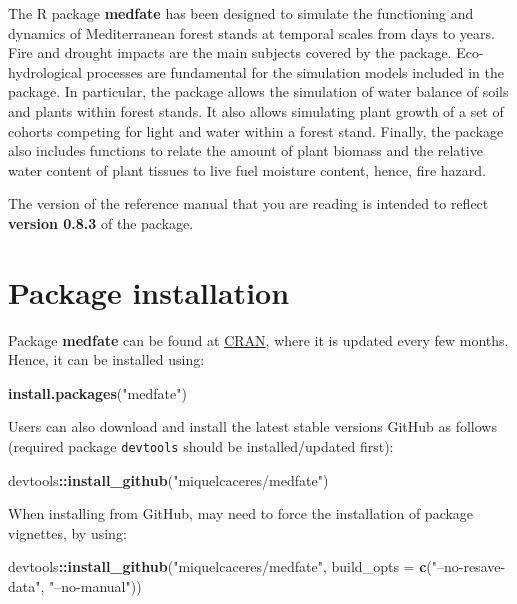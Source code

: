 \documentclass[]{book}
\newenvironment{Shaded}{\begin{snugshade}}{\end{snugshade}}
\newcommand{\KeywordTok}[1]{\textcolor[rgb]{0.13,0.29,0.53}{\textbf{#1}}}
\newcommand{\DataTypeTok}[1]{\textcolor[rgb]{0.13,0.29,0.53}{#1}}
\newcommand{\StringTok}[1]{\textcolor[rgb]{0.31,0.60,0.02}{#1}}
\newcommand{\OperatorTok}[1]{\textcolor[rgb]{0.81,0.36,0.00}{\textbf{#1}}}
\newcommand{\NormalTok}[1]{#1}
\begin{document}
The R package \textbf{medfate} has been designed to simulate the
functioning and dynamics of Mediterranean forest stands at temporal
scales from days to years. Fire and drought impacts are the main
subjects covered by the package. Eco-hydrological processes are
fundamental for the simulation models included in the package. In
particular, the package allows the simulation of water balance of soils
and plants within forest stands. It also allows simulating plant growth
of a set of cohorts competing for light and water within a forest stand.
Finally, the package also includes functions to relate the amount of
plant biomass and the relative water content of plant tissues to live
fuel moisture content, hence, fire hazard.

The version of the reference manual that you are reading is intended to
reflect \textbf{version 0.8.3} of the package.

\section{Package installation}\label{package-installation}

Package \textbf{medfate} can be found at
\href{https://CRAN.R-project.org/package=medfate}{CRAN}, where it is
updated every few months. Hence, it can be installed using:

\begin{Shaded}
\begin{Highlighting}[]
\KeywordTok{install.packages}\NormalTok{(}\StringTok{"medfate"}\NormalTok{)}
\end{Highlighting}
\end{Shaded}

Users can also download and install the latest stable versions GitHub as
follows (required package \texttt{devtools} should be installed/updated
first):

\begin{Shaded}
\begin{Highlighting}[]
\NormalTok{devtools}\OperatorTok{::}\KeywordTok{install_github}\NormalTok{(}\StringTok{"miquelcaceres/medfate"}\NormalTok{)}
\end{Highlighting}
\end{Shaded}

When installing from GitHub, may need to force the installation of
package vignettes, by using:

\begin{Shaded}
\begin{Highlighting}[]
\NormalTok{devtools}\OperatorTok{::}\KeywordTok{install_github}\NormalTok{(}\StringTok{"miquelcaceres/medfate"}\NormalTok{, }
                         \DataTypeTok{build_opts =} \KeywordTok{c}\NormalTok{(}\StringTok{"--no-resave-data"}\NormalTok{, }\StringTok{"--no-manual"}\NormalTok{))}
\end{Highlighting}
\end{Shaded}
\end{document}
